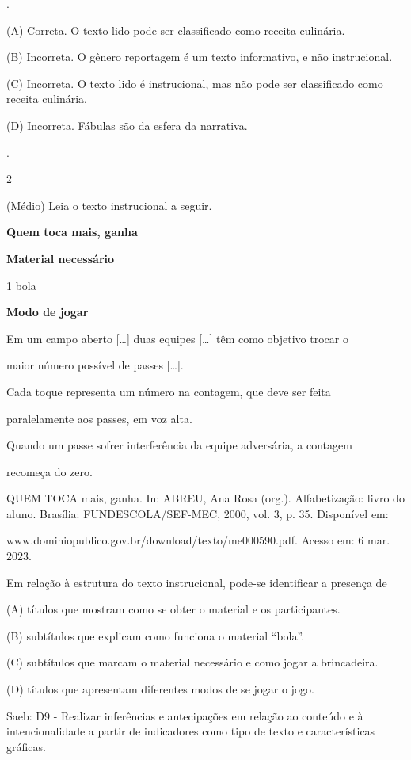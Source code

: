 \begin{itemize}
{{{\begin{itemize}
.

(A) Correta. O texto lido pode ser classificado como receita culinária.

(B) Incorreta. O gênero reportagem é um texto informativo, e não
instrucional.

(C) Incorreta. O texto lido é instrucional, mas não pode ser
classificado como receita culinária.

(D) Incorreta. Fábulas são da esfera da narrativa.

.

\num{2}

(Médio) \protect\hypertarget{_Hlk127521720}{}{}Leia o texto instrucional
a seguir.

\textbf{Quem toca mais, ganha}

\textbf{Material necessário}

1 bola

\textbf{Modo de jogar}

Em um campo aberto {[}\ldots{}{]} duas equipes {[}\ldots{}{]} têm como
objetivo trocar o

maior número possível de passes {[}\ldots{}{]}.

Cada toque representa um número na contagem, que deve ser feita

paralelamente aos passes, em voz alta.

Quando um passe sofrer interferência da equipe adversária, a contagem

recomeça do zero.

QUEM TOCA mais, ganha. In: ABREU, Ana Rosa (org.). Alfabetização: livro
do aluno. Brasília: FUNDESCOLA/SEF-MEC, 2000, vol. 3, p. 35. Disponível
em:

www.dominiopublico.gov.br/download/texto/me000590.pdf. Acesso em: 6 mar.
2023.

Em relação à estrutura do texto instrucional, pode-se identificar a
presença de

(A) títulos que mostram como se obter o material e os participantes.

(B) subtítulos que explicam como funciona o material ``bola''.

(C) subtítulos que marcam o material necessário e como jogar a
brincadeira.

(D) títulos que apresentam diferentes modos de se jogar o jogo.

Saeb: D9 - Realizar inferências e antecipações em relação ao conteúdo e
à intencionalidade a partir de indicadores como tipo de texto e
características gráficas.


\end{itemize}}}}
\end{itemize}
